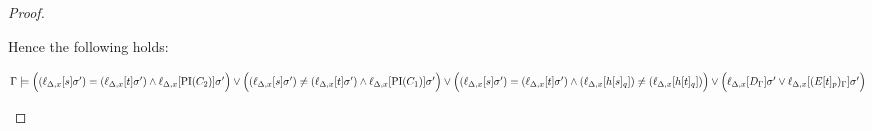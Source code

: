 \documentclass[,%
	paper=a4,%
	DIV14, 
	liststotoc,
	bibtotoc,
	draft=false,%
	numbers=noendperiod
]{scrartcl}
\newcommand{\lif}[1]{\lift{\Delta}{#1}{x}}
\begin{document}
\begin{proof}
\begin{description}
\begin{enumerate}
\begin{comment}
					Otherwise position $p$ is in a maximal $\Delta$-term $h\occurat{t}{q}$, such that $h\occurat{t}{q}$ and $h\occurat{s}{q}$ are replaced with distinct variables.
					But then clearly $\lif{h\occurat{s}{q}} \neq \lif{h\occurat{t}{q}}$.
				\end{proof}

				\end{comment}

 Hence the following holds:

				$\Gamma \entails
				\Big((\lif{s}\sigma')=(\lif{t}\sigma') \land \lif{\PI(C_2)}\sigma'\Big) \lor
				\Big((\lif{s}\sigma')\neq(\lif{t}\sigma') \land \lif{\PI(C_1)}\sigma'\Big) \lor
				\Big((\lif{s}\sigma')=(\lif{t}\sigma') \land (\lif{h\occurat{s}{q}}) \neq (\lif{h\occurat{t}{q}} )\Big) \lor
				\Big(\lif{D_\Gamma}\sigma' \lor \lif{(E\occurat{t}{p})_\Gamma}\sigma'\Big)$
				\qedhere
		\end{enumerate}


		\begin{comment}



			easy case:
			$\PI(C) = [ ( s=t \land \PI(C_2) ) \lor (s\neq t \land \PI(C_1)) ]\sigma$

			to show:
			$\Gamma \entails \lif{ [ (( s=t \land \PI(C_2) ) \lor (s\neq t \land \PI(C_1))) \lor (D \lor E[t]) ]\sigma} $

			proof idea: either $s=t$, then also $\PI(C_2)$, or else $s\neq t$, but then also $\PI(C_1)$

			by lemma \ref{lemma:lif} for $\sigma'$ as in lemma, 
			$\Gamma \entails \lif{ (( s=t \land \PI(C_2) ) \lor (s\neq t \land \PI(C_1))) \lor (D \lor E[t]) }\sigma' $

			by lemma 11 (huang)
			$\Gamma \entails [((\lif{s}=\lif{t} \land \lif{\PI(C_2)} ) \lor (\lif{s\neq t} \land \lif{\PI(C_1)})) \lor (\lif{D} \lor \lif{E[t]}) ]\sigma' $

			reformulate:
			$\Gamma \entails ((\lif{s}\sigma'=\lif{t}\sigma' \land \lif{\PI(C_2)}\sigma' ) \lor (\lif{s}\sigma'\neq \lif{t}\sigma' \land \lif{\PI(C_1)}\sigma')) \lor (\lif{D}\sigma' \lor \lif{E[t]}\sigma') $

			By the rule: $s\sigma = r\sigma$, hence also $\lif{s\sigma} = \lif{r\sigma}$ and $\lif{s}\sigma' = \lif{r}\sigma'$ REALLY TRUE? -- think so\dots

			Suppose $M \entails \Gamma$ and $M \not \entails (\lif{D}\sigma' \lor \lif{E[t]}\sigma') $.

			Suppose $M \entails \lif{s}\sigma' = \lif{t}\sigma'$.


\end{comment}
\end{description}
\end{proof}
\end{document}
